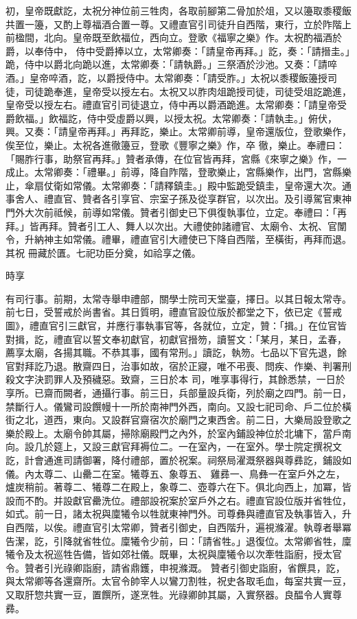 \begin{pinyinscope}
 初，皇帝既獻訖，太祝分神位前三牲肉，各取前腳第二骨加於俎，又以籩取黍稷飯共置一籩，又酌上尊福酒合置一尊。又禮直官引司徒升自西階，東行，立於阼階上前楹間，北向。皇帝既至飲福位，西向立。登歌《福寧之樂》作。太祝酌福酒於爵，以奉侍中，
 侍中受爵捧以立，太常卿奏：「請皇帝再拜。」訖，奏：「請搢圭。」跪，侍中以爵北向跪以進，太常卿奏：「請執爵。」三祭酒於沙池。又奏：「請啐酒。」皇帝啐酒，訖，以爵授侍中。太常卿奏：「請受胙。」太祝以黍稷飯籩授司徒，司徒跪奉進，皇帝受以授左右。太祝又以胙肉俎跪授司徒，司徒受俎訖跪進，皇帝受以授左右。禮直官引司徒退立，侍中再以爵酒跪進。太常卿奏：「請皇帝受爵飲福。」飲福訖，侍中受虛爵以興，以授太祝。太常卿奏：「請執圭。」俯伏，興。又奏：「請皇帝再拜。」再拜訖，樂止。太常卿前導，皇帝還版位，登歌樂作，俟至位，樂止。太祝各進徹籩豆，登歌《豐寧之樂》作，卒
 徹，樂止。奉禮曰：「賜胙行事，助祭官再拜。」贊者承傳，在位官皆再拜，宮縣《來寧之樂》作，一成止。太常卿奏：「禮畢。」前導，降自阼階，登歌樂止，宮縣樂作，出門，宮縣樂止，傘扇仗衛如常儀。太常卿奏：「請釋鎮圭。」殿中監跪受鎮圭，皇帝還大次。通事舍人、禮直官、贊者各引享官、宗室子孫及從享群官，以次出。及引導駕官東神門外大次前祗候，前導如常儀。贊者引御史已下俱復執事位，立定。奉禮曰：「再拜。」皆再拜。贊者引工人、舞人以次出。大禮使帥諸禮官、太廟令、太祝、官闈令，升納神主如常儀。禮畢，禮直官引大禮使已下降自西階，至橫街，再拜而退。其祝
 冊藏於匱。七祀功臣分奠，如祫享之儀。



 時享



 有司行事。前期，太常寺舉申禮部，關學士院司天堂臺，擇日。以其日報太常寺。前七日，受誓戒於尚書省。其日質明，禮直官設位版於都堂之下，依已定《誓戒圖》，禮直官引三獻官，并應行事執事官等，各就位，立定，贊：「揖。」在位官皆對揖，訖，禮直官以誓文奉初獻官，初獻官搢笏，讀誓文：「某月，某日，孟春，薦享太廟，各揚其職。不恭其事，國有常刑。」讀訖，執笏。七品以下官先退，餘官對拜訖乃退。散齋四日，治事如故，宿於正寢，唯不弔喪、問疾、作樂、判署刑殺文字決罰罪人及預穢惡。致齋，三日於本
 司，唯享事得行，其餘悉禁，一日於享所。已齋而闕者，通攝行事。前三日，兵部量設兵衛，列於廟之四門。前一日，禁斷行人。儀鸞司設饌幔十一所於南神門外西，南向。又設七祀司命、戶二位於橫街之北，道西，東向。又設群官齋宿次於廟門之東西舍。前二日，大樂局設登歌之樂於殿上。太廟令帥其屬，掃除廟殿門之內外，於室內鋪設神位於北墉下，當戶南向。設几於筵上，又設三獻官拜褥位二。一在室內，一在室外。學士院定撰祝文訖，計會通進司請御署，降付禮部，置於祝案。祠祭局濯溉祭器與尊彞訖，鋪設如儀。內太尊二、山罍二在室。犧尊五、象尊五、
 雞彞一、鳥彝一在室戶外之左，爐炭稍前。著尊二、犧尊二在殿上，象尊二、壺尊六在下。俱北向西上，加冪，皆設而不酌。并設獻官罍洗位。禮部設祝案於室戶外之右。禮直官設位版并省牲位，如式。前一日，諸太祝與廩犧令以牲就東神門外。司尊彝與禮直官及執事皆入，升自西階，以俟。禮直官引太常卿，贊者引御史，自西階升，遍視滌濯。執尊者舉冪告潔，訖，引降就省牲位。廩犧令少前，曰：「請省牲。」退復位。太常卿省牲，廩犧令及太祝巡牲告備，皆如郊社儀。既畢，太祝與廩犧令以次牽牲詣廚，授太官令。贊者引光祿卿詣廚，請省鼎鑊，申視滌溉。
 贊者引御史詣廚，省饌具，訖，與太常卿等各還齋所。太官令帥宰人以鸞刀割牲，祝史各取毛血，每室共實一豆，又取肝惣共實一豆，置饌所，遂烹牲。光祿卿帥其屬，入實祭器。良醖令人實尊彞。




\end{pinyinscope}
